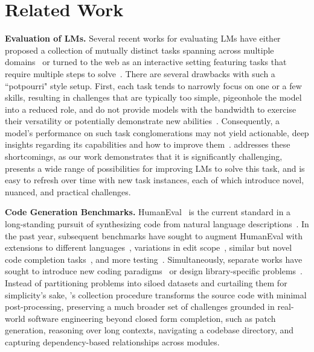 \section{Related Work}
\label{sec:related-work}

\textbf{Evaluation of LMs.}
Several recent works for evaluating LMs have either proposed a collection of mutually distinct tasks spanning across multiple domains~\citep{hendrycks2021measuring,liang2022holistic,srivastava2023imitation} or turned to the web as an interactive setting featuring tasks that require multiple steps to solve~\citep{yao2022webshop,zhou2023webarena,deng2023mind2web,liu2023agentbench}.
There are several drawbacks with such a ``potpourri" style setup.
First, each task tends to narrowly focus on one or a few skills, resulting in challenges that are typically too simple, pigeonhole the model into a reduced role, and do not provide models with the bandwidth to exercise their versatility or potentially demonstrate new abilities~\citep{srivastava2023imitation}.
Consequently, a model's performance on such task conglomerations may not yield actionable, deep insights regarding its capabilities and how to improve them~\citep{schlangen2019language,MartnezPlumed2021ResearchCD,bowman2021fix}.
\benchmark{} addresses these shortcomings, as our work demonstrates that it is significantly challenging, presents a wide range of possibilities for improving LMs to solve this task, and is easy to refresh over time with new task instances, each of which introduce novel, nuanced, and practical challenges.

\textbf{Code Generation Benchmarks.}
HumanEval~\citep{chen2021evaluating} is the current standard in a long-standing pursuit of synthesizing code from natural language descriptions~\citep{yu-etal-2018-spider,austin2021program,hendrycks2021measuring,li2022alphacode,zan2023large}.
In the past year, subsequent benchmarks have sought to augment HumanEval with extensions to different languages~\citep{cassano2022multiple,athiwaratkun2023multilingual,orlanski2023measuring}, variations in edit scope~\citep{yu2023codereval,du2023classeval}, similar but novel code completion tasks~\citep{muennighoff2023octopack}, and more testing~\citep{evalplus}.
Simultaneously, separate works have sought to introduce new coding paradigms~\citep{yin2022natural,yang2023intercode} or design library-specific problems~\citep{lai2022ds1000,zan2022cert}. 
Instead of partitioning problems into siloed datasets and curtailing them for simplicity's sake, \benchmark{}'s collection procedure transforms the source code with minimal post-processing, preserving a much broader set of challenges grounded in real-world software engineering beyond closed form completion, such as patch generation, reasoning over long contexts, navigating a codebase directory, and capturing dependency-based relationships across modules.

